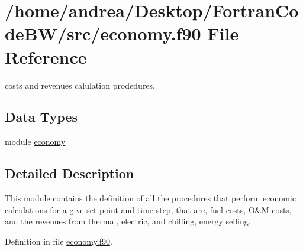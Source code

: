 \hypertarget{economy_8f90}{\section{/home/andrea/\-Desktop/\-Fortran\-Code\-B\-W/src/economy.f90 File Reference}
\label{economy_8f90}
}


costs and revenues calulation prodedures.  


\subsection*{Data Types}
\begin{DoxyCompactItemize}
\item 
module \hyperlink{classeconomy}{economy}
\end{DoxyCompactItemize}


\subsection{Detailed Description}
This module contains the definition of all the procedures that perform economic calculations for a give set-\/point and time-\/step, that are, fuel costs, O\&M costs, and the revenues from thermal, electric, and chilling, energy selling. 

Definition in file \hyperlink{economy_8f90_source}{economy.\-f90}.

